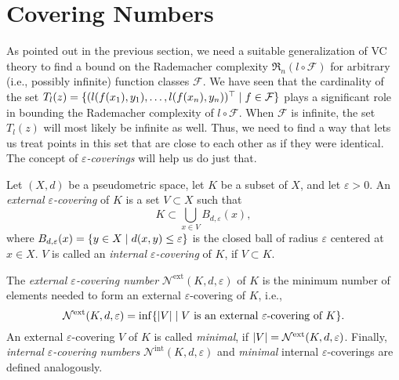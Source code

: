 \section{Covering Numbers}

As pointed out in the previous section, we need a suitable generalization of VC theory to find a bound on the Rademacher complexity $\mathfrak{R}_n(l \circ \mathcal{F})$ for arbitrary (i.e., possibly infinite) function classes $\mathcal{F}$. We have seen that the cardinality of the set $T_l(z) = \{(l(f(x_1), y_1), \dots, l(f(x_n), y_n))^{\top} \mathrel{|} f \in \mathcal{F}\}$ plays a significant role in bounding the Rademacher complexity of $l \circ \mathcal{F}$. When $\mathcal{F}$ is infinite, the set $T_l(z)$ will  most likely be infinite as well. Thus, we need to find a way that lets us treat points in this set that are close to each other as if they were identical. The concept of \emph{$\varepsilon$-coverings} will help us do just that.

\begin{definition}
Let $(X, d)$ be a pseudometric space, let $K$ be a subset of $X$, and let $\varepsilon > 0$. An \emph{external $\varepsilon$-covering} of $K$ is a set $V \subset X$ such that
\[
    K \subset \bigcup_{x \in V} B_{d, \varepsilon}(x),
\]
where $B_{d, \varepsilon}(x) = \set{y \in X \with d(x, y) \leq \varepsilon}$ is the closed ball of radius $\varepsilon$ centered at $x \in X$. $V$ is called an \emph{internal $\varepsilon$-covering} of $K$, if $V \subset K$.

The \emph{external $\varepsilon$-covering number} $\mathcal{N}^{\text{ext}}(K, d, \varepsilon)$ of $K$ is the minimum number of elements needed to form an external $\varepsilon$-covering of $K$, i.e.,
\[
    \mathcal{N}^{\text{ext}}(K, d, \varepsilon) = \inf\set{\abs{V} \with V \text{ is an external } \varepsilon \text{-covering of } K}.
\]
An external $\varepsilon$-covering $V$ of $K$ is called \emph{minimal}, if $\abs{V} = \mathcal{N}^{\text{ext}}(K, d, \varepsilon)$. Finally, \emph{internal $\varepsilon$-covering numbers} $\mathcal{N}^{\text{int}}(K, d, \varepsilon)$ and \emph{minimal} internal $\varepsilon$-coverings are defined analogously.
\end{definition}

